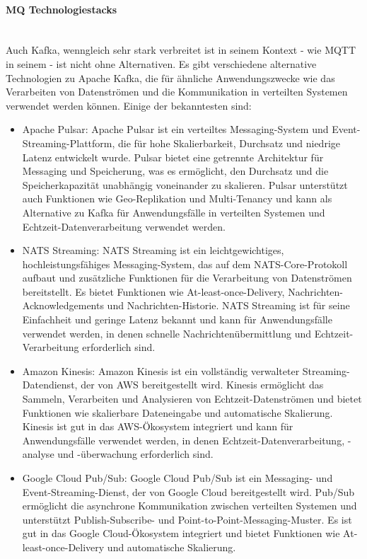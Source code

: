 \paragraph{MQ Technologiestacks\\\\}
Auch Kafka, wenngleich sehr stark verbreitet ist in seinem Kontext - wie MQTT in seinem - ist nicht ohne Alternativen. Es gibt verschiedene alternative Technologien zu Apache Kafka, die für ähnliche Anwendungszwecke wie das Verarbeiten von Datenströmen und die Kommunikation in verteilten Systemen verwendet werden können. Einige der bekanntesten sind:
\begin{itemize}
\item Apache Pulsar: Apache Pulsar ist ein verteiltes Messaging-System und Event-Streaming-Plattform, die für hohe Skalierbarkeit, Durchsatz und niedrige Latenz entwickelt wurde. Pulsar bietet eine getrennte Architektur für Messaging und Speicherung, was es ermöglicht, den Durchsatz und die Speicherkapazität unabhängig voneinander zu skalieren. Pulsar unterstützt auch Funktionen wie Geo-Replikation und Multi-Tenancy und kann als Alternative zu Kafka für Anwendungsfälle in verteilten Systemen und Echtzeit-Datenverarbeitung verwendet werden.
\item NATS Streaming: NATS Streaming ist ein leichtgewichtiges, hochleistungsfähiges Messaging-System, das auf dem NATS-Core-Protokoll aufbaut und zusätzliche Funktionen für die Verarbeitung von Datenströmen bereitstellt. Es bietet Funktionen wie At-least-once-Delivery, Nachrichten-Acknowledgements und Nachrichten-Historie. NATS Streaming ist für seine Einfachheit und geringe Latenz bekannt und kann für Anwendungsfälle verwendet werden, in denen schnelle Nachrichtenübermittlung und Echtzeit-Verarbeitung erforderlich sind.
\item Amazon Kinesis: Amazon Kinesis ist ein vollständig verwalteter Streaming-Datendienst, der von AWS bereitgestellt wird. Kinesis ermöglicht das Sammeln, Verarbeiten und Analysieren von Echtzeit-Datenströmen und bietet Funktionen wie skalierbare Dateneingabe und automatische Skalierung. Kinesis ist gut in das AWS-Ökosystem integriert und kann für Anwendungsfälle verwendet werden, in denen Echtzeit-Datenverarbeitung, -analyse und -überwachung erforderlich sind.
\item Google Cloud Pub/Sub: Google Cloud Pub/Sub ist ein Messaging- und Event-Streaming-Dienst, der von Google Cloud bereitgestellt wird. Pub/Sub ermöglicht die asynchrone Kommunikation zwischen verteilten Systemen und unterstützt Publish-Subscribe- und Point-to-Point-Messaging-Muster. Es ist gut in das Google Cloud-Ökosystem integriert und bietet Funktionen wie At-least-once-Delivery und automatische Skalierung.
\end{itemize}


